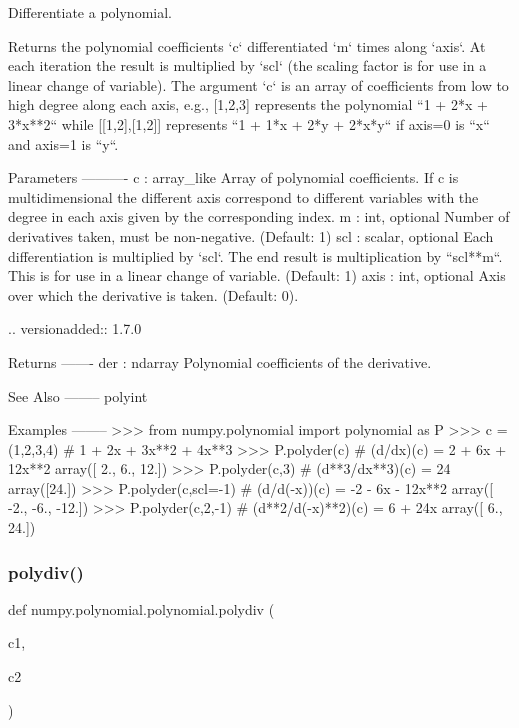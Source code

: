 \begin{DoxyVerb}Differentiate a polynomial.

Returns the polynomial coefficients `c` differentiated `m` times along
`axis`.  At each iteration the result is multiplied by `scl` (the
scaling factor is for use in a linear change of variable).  The
argument `c` is an array of coefficients from low to high degree along
each axis, e.g., [1,2,3] represents the polynomial ``1 + 2*x + 3*x**2``
while [[1,2],[1,2]] represents ``1 + 1*x + 2*y + 2*x*y`` if axis=0 is
``x`` and axis=1 is ``y``.

Parameters
----------
c : array_like
    Array of polynomial coefficients. If c is multidimensional the
    different axis correspond to different variables with the degree
    in each axis given by the corresponding index.
m : int, optional
    Number of derivatives taken, must be non-negative. (Default: 1)
scl : scalar, optional
    Each differentiation is multiplied by `scl`.  The end result is
    multiplication by ``scl**m``.  This is for use in a linear change
    of variable. (Default: 1)
axis : int, optional
    Axis over which the derivative is taken. (Default: 0).

    .. versionadded:: 1.7.0

Returns
-------
der : ndarray
    Polynomial coefficients of the derivative.

See Also
--------
polyint

Examples
--------
>>> from numpy.polynomial import polynomial as P
>>> c = (1,2,3,4) # 1 + 2x + 3x**2 + 4x**3
>>> P.polyder(c) # (d/dx)(c) = 2 + 6x + 12x**2
array([  2.,   6.,  12.])
>>> P.polyder(c,3) # (d**3/dx**3)(c) = 24
array([24.])
>>> P.polyder(c,scl=-1) # (d/d(-x))(c) = -2 - 6x - 12x**2
array([ -2.,  -6., -12.])
>>> P.polyder(c,2,-1) # (d**2/d(-x)**2)(c) = 6 + 24x
array([  6.,  24.])\end{DoxyVerb}
 \mbox{\label{namespacenumpy_1_1polynomial_1_1polynomial_ad6246439a74b50540523347d1dbeb110}} 
\subsubsection{\texorpdfstring{polydiv()}{polydiv()}}
{\footnotesize\ttfamily def numpy.\+polynomial.\+polynomial.\+polydiv (\begin{DoxyParamCaption}\item[{}]{c1,  }\item[{}]{c2 }\end{DoxyParamCaption})}

